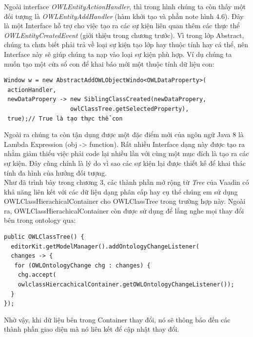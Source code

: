 Ngoài interface \textit{OWLEntityActionHandler}, thì trong hình chúng ta còn thấy một đối tượng là \textit{OWLEntityAddHandler} (hàm khởi tạo và phần note hình 4.6). Đây là một Interface hỗ trợ cho việc tạo ra các sự kiện liên quan thêm các thực thể \textit{OWLEntityCreatedEvent} (giới thiệu trong chương trước). Vì trong lớp Abstract, chúng ta chưa biết phải trả về loại sự kiện tạo lớp hay thuộc tính hay cá thể, nên Interface này sẽ giúp chúng ta nạp vào loại sự kiện phù hợp. Ví dụ chúng ta muốn tạo một cửa sổ con để khai báo mới một thuộc tính dữ liệu con:
\begin{verbatim}
Window w = new AbstractAddOWLObjectWindo<OWLDataProperty>(
 actionHandler,
 newDataPropery -> new SiblingClassCreated(newDataPropery, 
                   owlClassTree.getSelectedProperty),
 true);// True là tạo thực thể con
\end{verbatim}
Ngoài ra chúng ta còn tận dụng được một đặc điểm mới của ngôn ngữ Java 8 là Lambda Expression (obj -> function). Rất nhiều Interface dạng này được tạo ra nhằm giảm thiểu việc phải code lại nhiều lần với cùng một mục đích là tạo ra các sự kiện. Đây cũng chính là lý do vì sao các sự kiện lại được thiết kế để khai thác tính đa hình của hướng đối tượng.
\\
Như đã trình bày trong chương 3, các thành phần mở rộng từ \textit{Tree} của Vaadin có khả năng liên kết với các dữ liệu dạng phân cấp hay cụ thể chúng em sử dụng OWLClassHierachicalContainer cho OWLClassTree trong trường hợp này. Ngoài ra, OWLClassHierachicalContainer còn được sử dụng để lắng nghe mọi thay đổi bên trong ontology qua:
\begin{verbatim}
public OWLClassTree() {
  editorKit.getModelManager().addOntologyChangeListener(
  changes -> {
   for (OWLOntologyChange chg : changes) {
    chg.accept(
    owlclassHiercachicalContainer.getOWLOntologyChangeListener());
  }
});       
\end{verbatim}
Nhờ vậy, khi dữ liệu bên trong Container thay đổi, nó sẽ thông báo đến các thành phần giao diện mà nó liên kết để cập nhật thay đổi.
